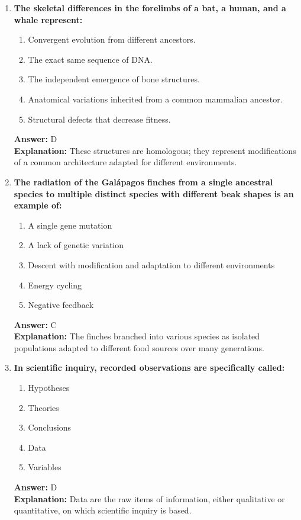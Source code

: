 \documentclass[11pt, a4paper]{article}
\begin{document}
\begin{enumerate}
\item \textbf{The skeletal differences in the forelimbs of a bat, a human, and a whale represent:}
\begin{enumerate}[label=\Alph*.]
    \item Convergent evolution from different ancestors.
    \item The exact same sequence of DNA.
    \item The independent emergence of bone structures.
    \item Anatomical variations inherited from a common mammalian ancestor.
    \item Structural defects that decrease fitness.
\end{enumerate}
\textbf{Answer:} D \\
\textbf{Explanation:} These structures are homologous; they represent modifications of a common architecture adapted for different environments.

\item \textbf{The radiation of the Galápagos finches from a single ancestral species to multiple distinct species with different beak shapes is an example of:}
\begin{enumerate}[label=\Alph*.]
    \item A single gene mutation
    \item A lack of genetic variation
    \item Descent with modification and adaptation to different environments
    \item Energy cycling
    \item Negative feedback
\end{enumerate}
\textbf{Answer:} C \\
\textbf{Explanation:} The finches branched into various species as isolated populations adapted to different food sources over many generations.

\item \textbf{In scientific inquiry, recorded observations are specifically called:}
\begin{enumerate}[label=\Alph*.]
    \item Hypotheses
    \item Theories
    \item Conclusions
    \item Data
    \item Variables
\end{enumerate}
\textbf{Answer:} D \\
\textbf{Explanation:} Data are the raw items of information, either qualitative or quantitative, on which scientific inquiry is based.


\end{enumerate}
\end{document}

